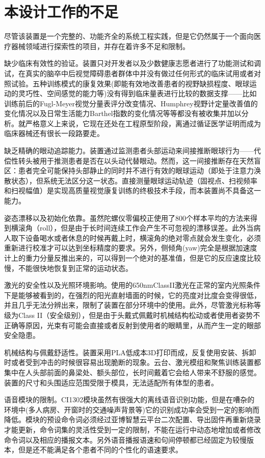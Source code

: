 \section{本设计工作的不足}

尽管该装置是一个完整的、功能齐全的系统工程实践，但是它仍然属于一个面向医疗器械领域进行探索性的项目，并存在着许多不足和限制。

缺少临床有效性的验证。装置只对开发者以及少数健康志愿者进行了功能测试和调试，在真实的脑卒中后视觉障碍患者群体中并没有做过任何形式的临床试用或者对照试验。五种训练模式的康复效果(即能有效地改善患者的视野缺损程度、眼球运动的灵巧性、空间感觉的能力等)没有得到临床量表进行比较的数据支撑——比如训练前后的Fugl-Meyer视觉分量表评分改变情况、Humphrey视野计定量改善值的变化情况以及日常生活能力Barthel指数的变化情况等等都没有被收集并加以分析。就严格意义上来说，它现在还处在工程原型阶段，离通过循证医学证明而成为临床器械还有很长一段路要走。

缺乏精确的眼动追踪能力。装置通过监测患者头部运动来间接推断眼球行为——代偿性转头被用于推测患者是否在以头动代替眼动。然而，这一间接推断存在天然盲区：患者完全可能保持头部静止的同时并不进行有效的眼球运动（即处于注意力涣散状态），但系统无法区分这一状态。直接测量眼球运动轨迹（固视点、扫视频率和扫视幅值）是实现高质量视觉康复训练的终极技术手段，而本装置尚不具备这一能力。

姿态漂移以及初始化依靠。虽然陀螺仪零偏校正使用了800个样本平均的方法来得到横滚角（roll），但是由于长时间连续工作会产生不可忽视的漂移误差。此外当病人取下设备喝水或者休息的时候再戴上时，横滚角的绝对零点就会发生变化，必须重新进行校准才可以达到坐标精度的要求。另外，侧倾角(yaw)完全是根据加速度计上的重力分量反推出来的，可以得到一个绝对的基准值，但是它的反应速度比较慢，不能很快地恢复到正常的运动状态。

激光的安全性以及光照环境影响。使用的650nmClassII激光在正常的室内光照条件下是能够被看到的，在强烈的阳光直射墙面的时候，它的亮度对比度会变得很低，并且几乎无法分辨出来，限制了装置在部分环境中的使用。此外，尽管激光标称等级为Class II（安全级别），但是由于头戴式佩戴时机械结构松动或者使用者姿势不正确等原因，光束有可能会直接或者反射到使用者的眼睛里，从而产生一定的眼部安全隐患。

机械结构与佩戴舒适性。装置采用PLA低成本3D打印而成，反复使用安装、拆卸时或者受到冲击的时候很容易出现脆断的现象。云台、激光模组和聚焦训练装置都集中在人头部前面的鼻梁处、额头部位，长时间戴着它会给人带来不舒服的感觉。装置的尺寸和头围适应范围受限于模具，无法适配所有体型的患者。

语音模块的限制。CI1302模块虽然有很强大的离线语音识别功能，但是在嘈杂的环境中(多人病房、开窗时的交通噪声背景等)它的识别成功率会受到一定的影响而降低。模块的预设命令词必须经过亚博智慧云平台二次配置、导出固件再重新烧录才能更新，命令词集的灵活性受到一定的限制，不能在运行中动态地增加或者修改命令词以及相应的播报文本。另外语音播报语速和句间停顿都已经固定为较慢版本，但是还不能满足各个患者不同的个性化的语速要求。


